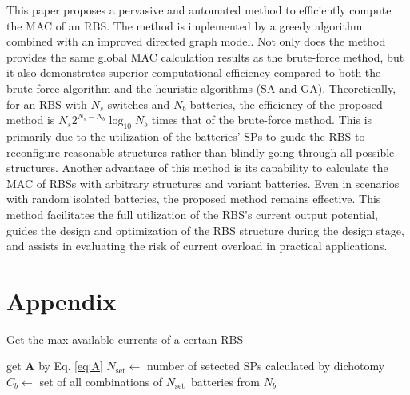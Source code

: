 \documentclass{article}
\begin{document}
This paper proposes a pervasive and automated method to efficiently compute the MAC of an RBS.
The method is implemented by a greedy algorithm combined with an improved directed graph model.
Not only does the method provides the same global MAC calculation results as the brute-force method, but it also demonstrates superior computational efficiency compared to both the brute-force algorithm and the heuristic algorithms (SA and GA). 
Theoretically, for an RBS with $N_s$ switches and $N_b$ batteries, the efficiency of the proposed method is $N_s 2^{N_s - N_b} \log_{10} N_b$ times that of the brute-force method. 
This is primarily due to the utilization of the batteries' SPs to guide the RBS to reconfigure reasonable structures rather than blindly going through all possible structures.
Another advantage of this method is its capability to calculate the MAC of RBSs with arbitrary structures and variant batteries. 
Even in scenarios with random isolated batteries, the proposed method remains effective.
This method facilitates the full utilization of the RBS's current output potential, guides the design and optimization of the RBS structure during the design stage, and assists in evaluating the risk of current overload in practical applications.

\section{Appendix} 

\begin{algorithm}
    \caption{Get the max available currents of a certain RBS}\label{alg:greedy}
    \KwResult{$\max \eta$}
    get $\bm{A}$ by Eq. \ref{eq:A}\;
    {
        $N_{\text{set}} \leftarrow$ number of setected SPs calculated by dichotomy\;
        $C_b    \leftarrow$ set of all combinations of $N_{\text{set}} $~batteries from $N_b$\;
    }
\end{algorithm}
\end{document}

